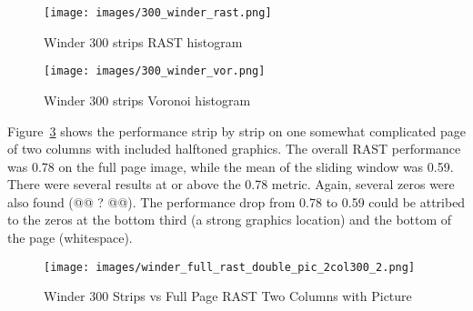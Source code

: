 \documentclass[conference]{IEEEtran}
\begin{document}
\begin{figure}[300-winder-rast]
\texttt{[image: images/300\_winder\_rast.png]}
\caption{Winder 300 strips RAST histogram}
\label{fig:300-winder-rast}
\end{figure}
\begin{figure}[300-winder-vor]
\texttt{[image: images/300\_winder\_vor.png]}
\caption{Winder 300 strips Voronoi histogram}
\label{fig:300-winder-vor}
\end{figure}



Figure~\ref{fig:winder-300-double-pic-2col300} shows the performance strip by strip on one somewhat complicated page of two columns with included halftoned graphics. 
The overall RAST performance was 0.78 on the full page image,
while the mean of the sliding window was 0.59. There were several results at
or above the 0.78 metric. Again, several zeros were also found (@@ ? @@). 
The performance drop from 0.78 to 0.59 could be attribed to the zeros at the bottom third (a strong
graphics location) and the bottom of the page (whitespace).

\begin{figure}[winder-300-double-pic-2col300]
\texttt{[image: images/winder\_full\_rast\_double\_pic\_2col300\_2.png]}
\caption{Winder 300 Strips vs Full Page RAST Two Columns with Picture}
\label{fig:winder-300-double-pic-2col300}
\end{figure}

\end{document}
